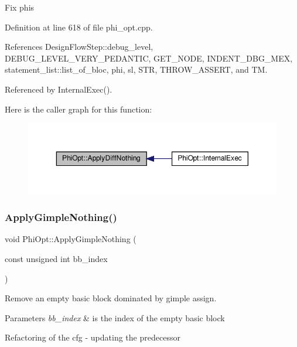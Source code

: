 Fix phis 

Definition at line 618 of file phi\+\_\+opt.\+cpp.



References Design\+Flow\+Step\+::debug\+\_\+level, D\+E\+B\+U\+G\+\_\+\+L\+E\+V\+E\+L\+\_\+\+V\+E\+R\+Y\+\_\+\+P\+E\+D\+A\+N\+T\+IC, G\+E\+T\+\_\+\+N\+O\+DE, I\+N\+D\+E\+N\+T\+\_\+\+D\+B\+G\+\_\+\+M\+EX, statement\+\_\+list\+::list\+\_\+of\+\_\+bloc, phi, sl, S\+TR, T\+H\+R\+O\+W\+\_\+\+A\+S\+S\+E\+RT, and TM.



Referenced by Internal\+Exec().

Here is the caller graph for this function\+:
\nopagebreak
\begin{figure}[H]
\begin{center}
\leavevmode
\includegraphics[width=350pt]{dc/ddf/classPhiOpt_a5d7228a841bc0ddd41c3bad7c338d7c2_icgraph}
\end{center}
\end{figure}
\mbox{\label{classPhiOpt_a1bfa08060f3cb11d7c12163b4bd83e7d}} 
\subsubsection{\texorpdfstring{Apply\+Gimple\+Nothing()}{ApplyGimpleNothing()}}
{\footnotesize\ttfamily void Phi\+Opt\+::\+Apply\+Gimple\+Nothing (\begin{DoxyParamCaption}\item[{const unsigned int}]{bb\+\_\+index }\end{DoxyParamCaption})\hspace{0.3cm}{\ttfamily [private]}}



Remove an empty basic block dominated by gimple assign. 


\begin{DoxyParams}{Parameters}
{\em bb\+\_\+index} & is the index of the empty basic block \\
\hline
\end{DoxyParams}
Refactoring of the cfg -\/ updating the predecessor

